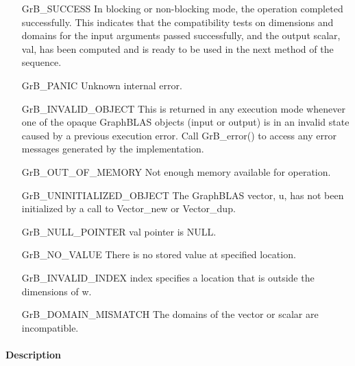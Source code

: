 \begin{itemize}[leftmargin=2.1in]
    \item[{\sf GrB\_SUCCESS}]  In blocking or non-blocking mode, the operation 
    completed successfully. This indicates that the compatibility tests on 
    dimensions and domains for the input arguments passed successfully, and
    the output scalar, {\sf val}, has been computed and is ready to be used in 
    the next method of the sequence.

    \item[{\sf GrB\_PANIC}]   Unknown internal error.
    
    \item[{\sf GrB\_INVALID\_OBJECT}] This is returned in any execution mode 
    whenever one of the opaque GraphBLAS objects (input or output) is in an invalid 
    state caused by a previous execution error.  Call {\sf GrB\_error()} to access 
    any error messages generated by the implementation.

    \item[{\sf GrB\_OUT\_OF\_MEMORY}]  Not enough memory available for operation.
    
    \item[{\sf GrB\_UNINITIALIZED\_OBJECT}]  The GraphBLAS vector, {\sf u}, has 
    not been initialized by a call to {\sf Vector\_new} or {\sf Vector\_dup}.
    
    \item[{\sf GrB\_NULL\_POINTER}]    {\sf val} pointer is {\sf NULL}.

    \item[{\sf GrB\_NO\_VALUE}]  There is no stored value at specified location.
    
    \item[{\sf GrB\_INVALID\_INDEX}]  {\sf index} specifies a location 
    that is outside the dimensions of {\sf w}.

    \item[{\sf GrB\_DOMAIN\_MISMATCH}]     The domains of the vector or scalar
    are incompatible.
\end{itemize}

\paragraph{Description}

